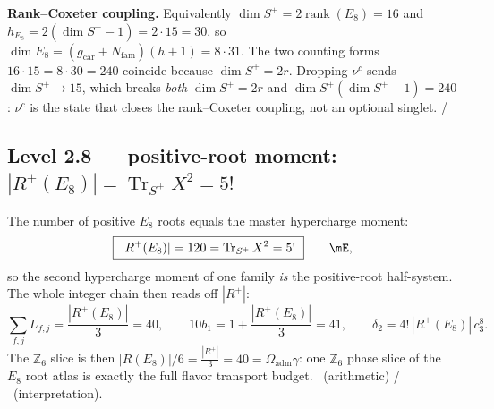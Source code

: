 \documentclass[11pt,a4paper]{article}
\newcommand{\gcar}{g_{\mathrm{car}}}
\newcommand{\Nfam}{N_{\mathrm{fam}}}
\newcommand{\Oadm}{\Omega_{\mathrm{adm}}}
\newcommand{\cthree}{c_3}
\newcommand{\dtwo}{\delta_2}
\theoremstyle{definition}
\begin{document}
\noindent\textbf{Rank--Coxeter coupling.} Equivalently $\dim S^+=2\operatorname{rank}(E_8)=16$ and
$h_{E_8}=2(\dim S^+-1)=2\cdot15=30$, so $\dim E_8=(\gcar+\Nfam)(h+1)=8\cdot31$. The two counting forms
$16\cdot15=8\cdot30=240$ coincide because $\dim S^+=2r$. Dropping $\nu^c$ sends $\dim S^+\to15$, which
breaks \emph{both} $\dim S^+=2r$ and $\dim S^+(\dim S^+-1)=240$: $\nu^c$ is the state that closes the
rank--Coxeter coupling, not an optional singlet. \mE/\mC

\subsection{Level 2.8 --- positive-root moment: $|R^+(E_8)|=\operatorname{Tr}_{S^+}X^2=5!$}
The number of positive $E_8$ roots equals the master hypercharge moment:
\begin{equation}
  \boxed{\ |R^+(E_8)|=120=\operatorname{Tr}_{S^+}X^2=5!\ }\qquad\mE,
\end{equation}
so the second hypercharge moment of one family \emph{is} the positive-root half-system. The whole
integer chain then reads off $|R^+|$:
\begin{equation}
  \sum_{f,j}L_{f,j}=\frac{|R^+(E_8)|}{3}=40,\qquad
  10b_1=1+\frac{|R^+(E_8)|}{3}=41,\qquad
  \dtwo=4!\,|R^+(E_8)|\,\cthree^8 .
\end{equation}
The $\mathbb Z_6$ slice is then $|R(E_8)|/6=\tfrac{|R^+|}{3}=40=\Oadm\gamma$: one $\mathbb Z_6$ phase
slice of the $E_8$ root atlas is exactly the full flavor transport budget. \mE\ (arithmetic) / \mC\
(interpretation).
\end{document}
